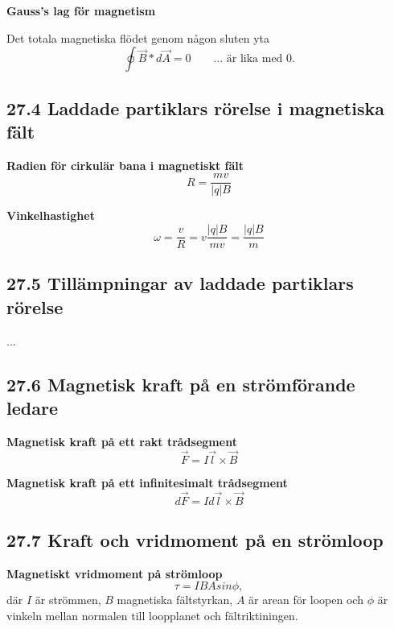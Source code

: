 \documentclass[a4paper]{article}
\begin{document}
\textbf{Gauss's lag för magnetism}

Det totala magnetiska flödet genom någon sluten yta 
\begin{equation}
\oint \vec{B}*d \vec{A} = 0 \qquad \text{... är lika med 0.}
\end{equation}

\subsection*{27.4 Laddade partiklars rörelse i magnetiska fält}
\textbf{Radien för cirkulär bana i magnetiskt fält}
\begin{equation}
R = \dfrac{mv}{|q|B}
\end{equation}

\textbf{Vinkelhastighet}
\begin{equation}
\omega = \dfrac{v}{R} = v \dfrac{|q|B}{mv} = \dfrac{|q|B}{m}
\end{equation}

\subsection*{27.5 Tillämpningar av laddade partiklars rörelse}
...

\subsection*{27.6 Magnetisk kraft på en strömförande ledare}
\textbf{Magnetisk kraft på ett rakt trådsegment}
\begin{equation}
\vec{F} = I \vec{l} \times \vec{B}
\end{equation}

\textbf{Magnetisk kraft på ett infinitesimalt trådsegment}
\begin{equation}
d \vec{F} = I d \vec{l} \times \vec{B}
\end{equation}

\subsection*{27.7 Kraft och vridmoment på en strömloop}

\textbf{Magnetiskt vridmoment på strömloop}
\begin{equation}
\tau = IBAsin\phi,
\end{equation}
där $I$ är strömmen, $B$ magnetiska fältstyrkan, $A$ är arean för loopen och $\phi$ är vinkeln mellan normalen till loopplanet och fältriktiningen.
\end{document}
